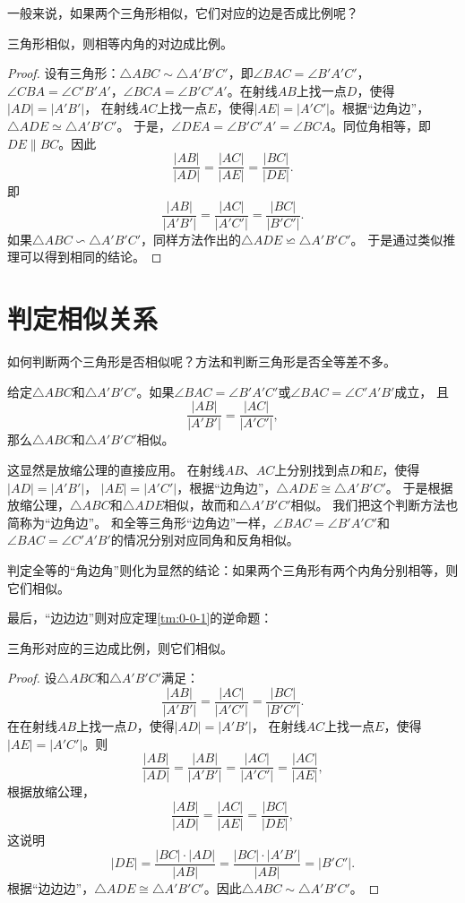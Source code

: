 \documentclass[12pt,UTF8]{ctexbook}
\begin{document}
一般来说，如果两个三角形相似，它们对应的边是否成比例呢？
\begin{tm}\label{tm:0-0-1}
    三角形相似，则相等内角的对边成比例。
\end{tm}
\begin{proof}
    设有三角形：$\triangle ABC \sim \triangle A'B'C'$，即$\angle BAC = \angle B'A'C'$，
    $\angle CBA = \angle C'B'A'$，$\angle BCA = \angle B'C'A'$。在射线$AB$上找一点$D$，使得$|AD| = |A'B'|$，
    在射线$AC$上找一点$E$，使得$|AE| = |A'C'|$。根据“边角边”，$\triangle ADE \simeq \triangle A'B'C'$。
    于是，$\angle DEA = \angle B'C'A' = \angle BCA$。同位角相等，即$DE \parallel BC$。因此
    $$ \frac{|AB|}{|AD|} = \frac{|AC|}{|AE|} = \frac{|BC|}{|DE|}.$$
    即
    $$ \frac{|AB|}{|A'B'|} = \frac{|AC|}{|A'C'|} = \frac{|BC|}{|B'C'|}.$$
    如果$\triangle ABC \backsim \triangle A'B'C'$，同样方法作出的$\triangle ADE \backsimeq \triangle A'B'C'$。
    于是通过类似推理可以得到相同的结论。
\end{proof}

\section{判定相似关系}
如何判断两个三角形是否相似呢？方法和判断三角形是否全等差不多。

\begin{tm}\label{tm:0-1-0}
    给定$\triangle ABC$和$\triangle A'B'C'$。如果$\angle BAC = \angle B'A'C'$或$\angle BAC = \angle C'A'B'$成立，
    且
    $$ \frac{|AB|}{|A'B'|} = \frac{|AC|}{|A'C'|},$$
    那么$\triangle ABC$和$\triangle A'B'C'$相似。
\end{tm}
这显然是放缩公理的直接应用。
在射线$AB$、$AC$上分别找到点$D$和$E$，使得$|AD| = |A'B'|$，
$|AE| = |A'C'|$，根据“边角边”，$\triangle ADE \cong \triangle A'B'C'$。
于是根据放缩公理，$\triangle ABC$和$\triangle ADE$相似，故而和$\triangle A'B'C'$相似。
我们把这个判断方法也简称为“边角边”。
和全等三角形“边角边”一样，$\angle BAC = \angle B'A'C'$和$\angle BAC = \angle C'A'B'$的情况分别对应同角和反角相似。

判定全等的“角边角”则化为显然的结论：如果两个三角形有两个内角分别相等，则它们相似。

最后，“边边边”则对应定理\ref{tm:0-0-1}的逆命题：
\begin{tm}\label{tm:0-1-1}
    三角形对应的三边成比例，则它们相似。
\end{tm}
\begin{proof}
    设$\triangle ABC$和$\triangle A'B'C'$满足：
    $$ \frac{|AB|}{|A'B'|} = \frac{|AC|}{|A'C'|} = \frac{|BC|}{|B'C'|}.$$
    在在射线$AB$上找一点$D$，使得$|AD| = |A'B'|$，
    在射线$AC$上找一点$E$，使得$|AE| = |A'C'|$。则
    $$ \frac{|AB|}{|AD|} = \frac{|AB|}{|A'B'|} = \frac{|AC|}{|A'C'|} = \frac{|AC|}{|AE|},$$
    根据放缩公理，
    $$ \frac{|AB|}{|AD|} = \frac{|AC|}{|AE|} = \frac{|BC|}{|DE|},$$
    这说明
    $$ |DE| = \frac{|BC|\cdot |AD|}{|AB|} = \frac{|BC|\cdot |A'B'|}{|AB|} = |B'C'|. $$
    根据“边边边”，$\triangle ADE \cong \triangle A'B'C'$。因此$\triangle ABC \sim \triangle A'B'C'$。
\end{proof}
\end{document}
